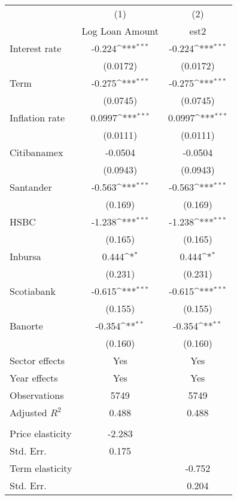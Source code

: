 {
\def\sym#1{\ifmmode^{#1}\else\(^{#1}\)\fi}
\begin{tabular}{l*{2}{c}}
\hline\hline
                &\multicolumn{1}{c}{(1)}&\multicolumn{1}{c}{(2)}\\
                &\multicolumn{1}{c}{Log Loan Amount}&\multicolumn{1}{c}{est2}\\
\hline
Interest rate   &   -0.224\sym{***}&   -0.224\sym{***}\\
                & (0.0172)         & (0.0172)         \\
Term            &   -0.275\sym{***}&   -0.275\sym{***}\\
                & (0.0745)         & (0.0745)         \\
Inflation rate  &   0.0997\sym{***}&   0.0997\sym{***}\\
                & (0.0111)         & (0.0111)         \\
Citibanamex     &  -0.0504         &  -0.0504         \\
                & (0.0943)         & (0.0943)         \\
Santander       &   -0.563\sym{***}&   -0.563\sym{***}\\
                &  (0.169)         &  (0.169)         \\
HSBC            &   -1.238\sym{***}&   -1.238\sym{***}\\
                &  (0.165)         &  (0.165)         \\
Inbursa         &    0.444\sym{*}  &    0.444\sym{*}  \\
                &  (0.231)         &  (0.231)         \\
Scotiabank      &   -0.615\sym{***}&   -0.615\sym{***}\\
                &  (0.155)         &  (0.155)         \\
Banorte         &   -0.354\sym{**} &   -0.354\sym{**} \\
                &  (0.160)         &  (0.160)         \\
Sector effects  &      Yes         &      Yes         \\
Year effects    &      Yes         &      Yes         \\
\hline
Observations    &     5749         &     5749         \\
Adjusted \(R^{2}\)&    0.488         &    0.488         \\
\hline          &                  &                  \\
\hspace{5mm} Price elasticity&   -2.283         &                  \\
\hspace{5mm} Std. Err.&    0.175         &                  \\
\hspace{5mm} Term elasticity&                  &   -0.752         \\
\hspace{5mm} Std. Err.&                  &    0.204         \\
\hline\hline
\end{tabular}
}
